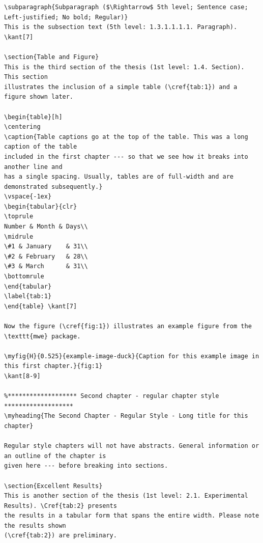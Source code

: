 \documentclass[letterpaper]{refart}
\begin{document}
{\begin{verbatim}
\subparagraph{Subparagraph ($\Rightarrow$ 5th level; Sentence case; Left-justified; No bold; Regular)}
This is the subsection text (5th level: 1.3.1.1.1.1. Paragraph). \kant[7]

\section{Table and Figure}
This is the third section of the thesis (1st level: 1.4. Section). This section
illustrates the inclusion of a simple table (\cref{tab:1}) and a figure shown later.

\begin{table}[h]
\centering
\caption{Table captions go at the top of the table. This was a long caption of the table
included in the first chapter --- so that we see how it breaks into another line and
has a single spacing. Usually, tables are of full-width and are demonstrated subsequently.}
\vspace{-1ex}
\begin{tabular}{clr}
\toprule
Number & Month & Days\\
\midrule
\#1 & January    & 31\\
\#2 & February   & 28\\
\#3 & March      & 31\\
\bottomrule
\end{tabular}
\label{tab:1}
\end{table}	\kant[7]

Now the figure (\cref{fig:1}) illustrates an example figure from the \texttt{mwe} package.

\myfig{H}{0.525}{example-image-duck}{Caption for this example image in this first chapter.}{fig:1} 	
\kant[8-9]

%******************* Second chapter - regular chapter style *******************
\myheading{The Second Chapter - Regular Style - Long title for this chapter}

Regular style chapters will not have abstracts. General information or an outline of the chapter is 
given here --- before breaking into sections.

\section{Excellent Results}
This is another section of the thesis (1st level: 2.1. Experimental Results). \Cref{tab:2} presents 
the results in a tabular form that spans the entire width. Please note the results shown 
(\cref{tab:2}) are preliminary.


\end{verbatim}}
\end{document}
